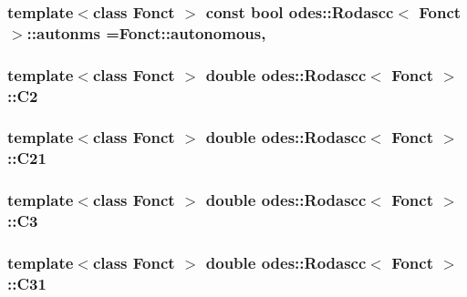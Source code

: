 \hypertarget{classodes_1_1Rodascc_ab1265c0c702209400960dd5dc51259af}{
\subsubsection[{autonms}]{\setlength{\rightskip}{0pt plus 5cm}template$<$class Fonct $>$ const bool {\bf odes\-::\-Rodascc}$<$ Fonct $>$\-::autonms =Fonct\-::autonomous\hspace{0.3cm}{\ttfamily [static]}, {\ttfamily [private]}}}\label{classodes_1_1Rodascc_ab1265c0c702209400960dd5dc51259af}
\hypertarget{classodes_1_1Rodascc_a1d9ebe679b3fcc788bc1a1c05a40310f}{
\subsubsection[{C2}]{\setlength{\rightskip}{0pt plus 5cm}template$<$class Fonct $>$ double {\bf odes\-::\-Rodascc}$<$ Fonct $>$\-::C2\hspace{0.3cm}{\ttfamily [private]}}}\label{classodes_1_1Rodascc_a1d9ebe679b3fcc788bc1a1c05a40310f}
\hypertarget{classodes_1_1Rodascc_a4d18523d9ee124366bbea21302e3f4b1}{
\subsubsection[{C21}]{\setlength{\rightskip}{0pt plus 5cm}template$<$class Fonct $>$ double {\bf odes\-::\-Rodascc}$<$ Fonct $>$\-::C21\hspace{0.3cm}{\ttfamily [private]}}}\label{classodes_1_1Rodascc_a4d18523d9ee124366bbea21302e3f4b1}
\hypertarget{classodes_1_1Rodascc_a3dc93ebd73797ceccf359f22ed40024d}{
\subsubsection[{C3}]{\setlength{\rightskip}{0pt plus 5cm}template$<$class Fonct $>$ double {\bf odes\-::\-Rodascc}$<$ Fonct $>$\-::C3\hspace{0.3cm}{\ttfamily [private]}}}\label{classodes_1_1Rodascc_a3dc93ebd73797ceccf359f22ed40024d}
\hypertarget{classodes_1_1Rodascc_af9ada89328f5ef2b06b88d352fc0da6b}{
\subsubsection[{C31}]{\setlength{\rightskip}{0pt plus 5cm}template$<$class Fonct $>$ double {\bf odes\-::\-Rodascc}$<$ Fonct $>$\-::C31\hspace{0.3cm}{\ttfamily [private]}}}\label{classodes_1_1Rodascc_af9ada89328f5ef2b06b88d352fc0da6b}
